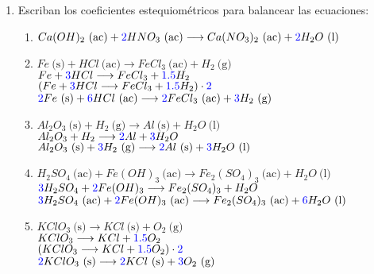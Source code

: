 \documentclass[../Práctica.root.tex]{subfiles}
\newcommand{\lra}{\ensuremath{\longrightarrow{}}}
\newcommand{\eac}{\ \text{(ac)}}
\newcommand{\es}{\ \text{(s)}}
\newcommand{\el}{\ \text{(l)}}
\newcommand{\eg}{\ \text{(g)}}
\begin{document}
\begin{enumerate}
    \item Escriban los coeficientes estequiométricos para balancear las ecuaciones:
          \begin{enumerate}
              \item $Ca(OH)_2 \eac + \blue{2}HNO_3 \eac \lra Ca(NO_3)_2 \eac + \blue{2}H_2O \el$
              \item $Fe \es + HCl \eac \lra FeCl_3 \eac + H_2 \eg$ \\
                    $Fe + \blue{3}HCl \lra FeCl_3 + \blue{\num{1,5}}H_2$ \\
                    $(Fe + \blue{3}HCl \lra FeCl_3 + \blue{\num{1,5}}H_2)\cdot\blue{\num{2}}$ \\
                    $\blue{2}Fe \es + \blue{6}HCl \eac \lra \blue{2}FeCl_3 \eac + \blue{3}H_2 \eg$
              \item $Al_2O_3 \es + H_2 \eg \lra Al \es + H_2O \el$ \\
                    $Al_2O_3 + H_2 \lra \blue{2}Al + \blue{3}H_2O$ \\
                    $Al_2O_3 \es + \blue{3}H_2 \eg \lra \blue{2}Al \es + \blue{3}H_2O \el$
              \item $H_2SO_4 \eac + Fe(OH)_3 \eac \lra Fe_2(SO_4)_3 \eac + H_2O \el$ \\
                    $\blue{3}H_2SO_4 + \blue{2}Fe(OH)_3 \lra Fe_2(SO_4)_3 + H_2O$ \\
                    $\blue{3}H_2SO_4 \eac + \blue{2}Fe(OH)_3 \eac \lra Fe_2(SO_4)_3 \eac + \blue{6}H_2O \el$
              \item $KClO_3 \es \lra KCl \es + O_2 \eg$ \\
                    $KClO_3 \lra KCl + \blue{\num{1,5}}O_2$ \\
                    $(KClO_3 \lra KCl + \blue{\num{1,5}}O_2)\cdot\blue{\num{2}}$ \\
                    $\blue{2}KClO_3 \es \lra \blue{2}KCl \es + \blue{3}O_2 \eg$
          \end{enumerate}


\end{enumerate}
\end{document}
